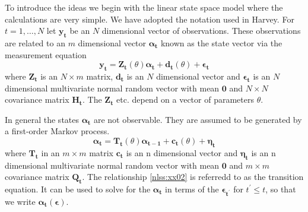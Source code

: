 \def\B{\boldsymbol{0}}
\def\Bzero{\boldsymbol{0}}
\def\Byt{\boldsymbol{y_t}}
\def\Bytwo{\boldsymbol{y_2}}
\def\Bytwo{\boldsymbol{Y_2}}
\def\Byo{\boldsymbol{y_1}}
\def\Byone{\boldsymbol{y_1}}
\def\Bytwo{\boldsymbol{y_2}}
\def\ByT{\boldsymbol{y_T}}
\def\BY{\boldsymbol{Y}}
\def\Bdt{\boldsymbol{d_t}}
\def\Bct{\boldsymbol{c_t}}
\def\BZt{\boldsymbol{Z_t}}
\def\BQt{\boldsymbol{Q_t}}
\def\BTt{\boldsymbol{T_t}}
\def\BHt{\boldsymbol{H_t}}
\def\Balphat{\boldsymbol{\alpha_t}}
\def\BalphaT{\boldsymbol{\alpha_T}}
\def\BalphaTm{\boldsymbol{\alpha_{T-1}}}
\def\Balphatm{\boldsymbol{\alpha_{t-1}}}
\def\BalphaTmtwo{\boldsymbol{\alpha_{T-2}}}
\def\Balphatp{\boldsymbol{\alpha_{t+1}}}
\def\Balpha{\boldsymbol{\alpha}}
\def\Balphatwo{\boldsymbol{\alpha_2}}
\def\Balphathree{\boldsymbol{\alpha_3}}
\def\Balphao{\boldsymbol{\alpha_1}}
\def\Balphaone{\boldsymbol{\alpha_1}}
\def\Balphaz{\boldsymbol{\alpha_0}}
\def\Baz{\mathbf{a}_0}
\def\BPz{\mathbf{P}_0}
\def\Betat{\boldsymbol{\eta_t}}
\def\Balphato{\boldsymbol{\alpha_{t-1}}}
\def\Bepst{\boldsymbol{\epsilon_t}}
\def\Bepstprime{\boldsymbol{\epsilon_{t^\prime}}}
\def\Bepsone{\boldsymbol{\epsilon_1}}
\def\Bepstwo{\boldsymbol{\epsilon_2}}
\def\BepsT{\boldsymbol{\epsilon_T}}
\def\Beps{\boldsymbol{\epsilon}}

To introduce the ideas we begin with the linear state space model where the
calculations are very simple. We have adopted the  notation used in Harvey.
For $t=1,\ldots,N$ let $\Byt$ be an  $N$ dimensional vector of observations.
These observations are related to an $m$ dimensional vector $\Balphat$
known as the state vector via the measurement equation
\begin{equation}
\Byt=\BZt(\theta)\Balphat+\Bdt(\theta)+\Bepst\label{nlss:xx01}
\end{equation}
where $\BZt$ is an $N\times m$ matrix, $\Bdt$ is an  $N$ dimensional vector
and $\Bepst$ is an $N$ dimensional multivariate normal random vector 
with mean $\Bzero$ and $N\times N$ covariance matrix $\BHt$.
The  $\BZt$  etc. depend on a vector of parameters $\theta$.


In general the states $\Balphat$ are not observable. They are assumed to be generated by a first-order Markov process.
\begin{equation}
\Balphat=\BTt(\theta)\Balphato+\Bct(\theta)+\Betat\label{nlss:xx02}
\end{equation}
where $\BTt$ in an $m \times m$ matrix $\Bct$ is an n dimensional vector
and $\Betat$ is an n dimensional multivariate normal random vector 
with mean $\Bzero$ and $m\times m$ covariance matrix $\BQt$.
The relationship \ref{nlss:xx02} is referredd to as the transition equation.
It can be used to solve for the
$\Balphat$ in terms of the $\Bepstprime$ for $t^\prime \le t$,
so that we write
$\Balphat(\Beps)$.

